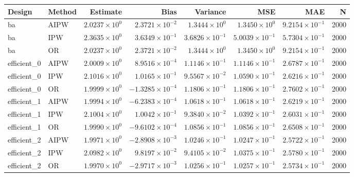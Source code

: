 \begin{table}[ht]
\centering
\begin{tabular}{llrrrrrr}
  \toprule
Design & Method & Estimate & Bias & Variance & MSE & MAE & N \\ 
  \midrule
ba & AIPW & $2.0237 \times 10^{0}$ & $2.3721 \times 10^{-2}$ & $1.3444 \times 10^{0}$ & $1.3450 \times 10^{0}$ & $9.2154 \times 10^{-1}$ & 2000 \\ 
  ba & IPW & $2.3635 \times 10^{0}$ & $3.6349 \times 10^{-1}$ & $3.6826 \times 10^{-1}$ & $5.0039 \times 10^{-1}$ & $5.7304 \times 10^{-1}$ & 2000 \\ 
  ba & OR & $2.0237 \times 10^{0}$ & $2.3721 \times 10^{-2}$ & $1.3444 \times 10^{0}$ & $1.3450 \times 10^{0}$ & $9.2154 \times 10^{-1}$ & 2000 \\ 
   \midrule
efficient\_0 & AIPW & $2.0009 \times 10^{0}$ & $8.9516 \times 10^{-4}$ & $1.1146 \times 10^{-1}$ & $1.1146 \times 10^{-1}$ & $2.6787 \times 10^{-1}$ & 2000 \\ 
  efficient\_0 & IPW & $2.1016 \times 10^{0}$ & $1.0165 \times 10^{-1}$ & $9.5567 \times 10^{-2}$ & $1.0590 \times 10^{-1}$ & $2.6216 \times 10^{-1}$ & 2000 \\ 
  efficient\_0 & OR & $1.9999 \times 10^{0}$ & $-1.3285 \times 10^{-4}$ & $1.1806 \times 10^{-1}$ & $1.1806 \times 10^{-1}$ & $2.7602 \times 10^{-1}$ & 2000 \\ 
   \midrule
efficient\_1 & AIPW & $1.9994 \times 10^{0}$ & $-6.2383 \times 10^{-4}$ & $1.0618 \times 10^{-1}$ & $1.0618 \times 10^{-1}$ & $2.6219 \times 10^{-1}$ & 2000 \\ 
  efficient\_1 & IPW & $2.1004 \times 10^{0}$ & $1.0042 \times 10^{-1}$ & $9.3840 \times 10^{-2}$ & $1.0392 \times 10^{-1}$ & $2.6031 \times 10^{-1}$ & 2000 \\ 
  efficient\_1 & OR & $1.9990 \times 10^{0}$ & $-9.6102 \times 10^{-4}$ & $1.0856 \times 10^{-1}$ & $1.0856 \times 10^{-1}$ & $2.6508 \times 10^{-1}$ & 2000 \\ 
   \midrule
efficient\_2 & AIPW & $1.9971 \times 10^{0}$ & $-2.8908 \times 10^{-3}$ & $1.0246 \times 10^{-1}$ & $1.0247 \times 10^{-1}$ & $2.5722 \times 10^{-1}$ & 2000 \\ 
  efficient\_2 & IPW & $2.0982 \times 10^{0}$ & $9.8197 \times 10^{-2}$ & $9.4105 \times 10^{-2}$ & $1.0375 \times 10^{-1}$ & $2.5780 \times 10^{-1}$ & 2000 \\ 
  efficient\_2 & OR & $1.9970 \times 10^{0}$ & $-2.9717 \times 10^{-3}$ & $1.0256 \times 10^{-1}$ & $1.0257 \times 10^{-1}$ & $2.5734 \times 10^{-1}$ & 2000 \\ 

\end{tabular}
\end{table}
